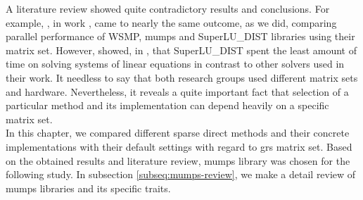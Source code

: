 A literature review showed quite contradictory results and conclusions. For example, \citeauthor{wsmp}, in work \cite{wsmp}, came to nearly the same outcome, as we did, comparing parallel performance of WSMP, \gls{mumps} and SuperLU\_DIST libraries using their matrix set. However, \citeauthor{mm-comparison-of-packages} showed, in \cite{mm-comparison-of-packages}, that SuperLU\_DIST spent the least amount of time on solving  systems of linear equations in contrast to other solvers used in their work. It needless to say that both research groups used different matrix sets and hardware. Nevertheless, it reveals a quite important fact that selection of a particular method and its implementation can depend heavily on a specific matrix set.\\


In this chapter, we compared different sparse direct methods and their concrete implementations with their default settings with regard to \gls{grs} matrix set. Based on the obtained results and literature review, \gls{mumps} library was chosen for the following study. In subsection \ref{subseq:mumps-review}, we make a detail review of \gls{mumps} libraries and its specific traits. \\
